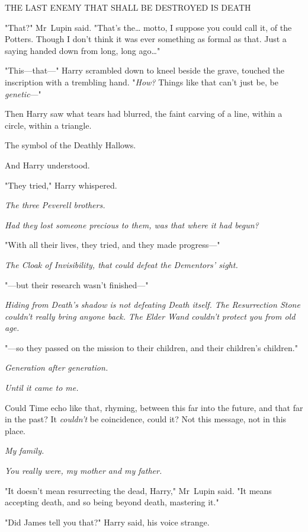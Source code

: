\begin{center}
THE LAST ENEMY THAT SHALL BE DESTROYED IS DEATH
\end{center}

"That?" Mr~Lupin said. "That's the{\ldots} motto, I suppose you could call it,
of the Potters. Though I don't think it was ever something as formal as that.
Just a saying handed down from long, long ago{\ldots}"

"This---that---" Harry scrambled down to kneel beside the grave, touched the
inscription with a trembling hand. "\emph{How?} Things like that can't just be,
be \emph{genetic}---"

Then Harry saw what tears had blurred, the faint carving of a line, within a
circle, within a triangle.

The symbol of the Deathly Hallows.

And Harry understood.

"They tried," Harry whispered.

\emph{The three Peverell brothers.}

\emph{Had they lost someone precious to them, was that where it had begun?}

"With all their lives, they tried, and they made progress---"

\emph{The Cloak of Invisibility, that could defeat the Dementors' sight.}

"---but their research wasn't finished---"

\emph{Hiding from Death's shadow is not defeating Death itself. The
Resurrection Stone couldn't really bring anyone back. The Elder Wand couldn't
protect you from old age.}

"---so they passed on the mission to their children, and their children's
children."

\emph{Generation after generation.}

\emph{Until it came to me.}

Could Time echo like that, rhyming, between this far into the future, and that
far in the past? It \emph{couldn't} be coincidence, could it? Not this message,
not in this place.

\emph{My family.}

\emph{You really were, my mother and my father.}

"It doesn't mean resurrecting the dead, Harry," Mr~Lupin said. "It means
accepting death, and so being beyond death, mastering it."

"Did James tell you that?" Harry said, his voice strange.

